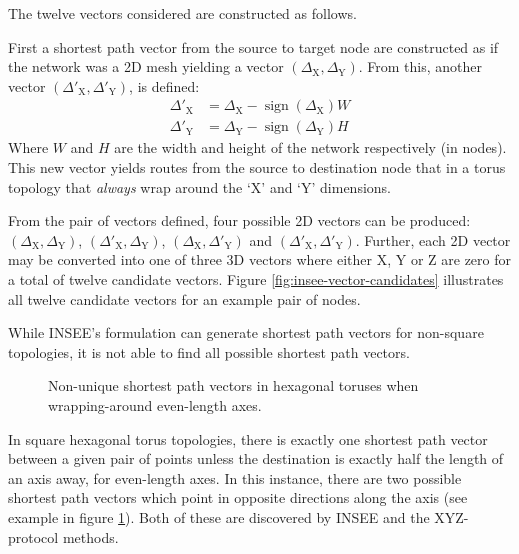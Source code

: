 			The twelve vectors considered are constructed as follows.
			
			First a shortest path vector from the source to target node are
			constructed as if the network was a 2D mesh yielding a vector
			$(\Delta_\textrm{X},\Delta_\textrm{Y})$. From this, another vector
			$(\Delta'_\textrm{X},\Delta'_\textrm{Y})$, is defined:
			\begin{align}
				\Delta'_\textrm{X} &= \Delta_\textrm{X} - \operatorname{sign}(\Delta_\textrm{X})W
				\\
				\Delta'_\textrm{Y} &= \Delta_\textrm{Y} - \operatorname{sign}(\Delta_\textrm{Y})H
			\end{align}
			Where $W$ and $H$ are the width and height of the network respectively
			(in nodes). This new vector yields routes from the source to destination
			node that in a torus topology that \emph{always} wrap around the `X' and
			`Y' dimensions.
			
			From the pair of vectors defined, four possible 2D vectors can be
			produced: $(\Delta_\textrm{X},\Delta_\textrm{Y})$,
			$(\Delta'_\textrm{X},\Delta_\textrm{Y})$,
			$(\Delta_\textrm{X},\Delta'_\textrm{Y})$ and
			$(\Delta'_\textrm{X},\Delta'_\textrm{Y})$. Further, each 2D vector may be
			converted into one of three 3D vectors where either X, Y or Z are zero
			for a total of twelve candidate vectors.  Figure
			\ref{fig:insee-vector-candidates} illustrates all twelve candidate
			vectors for an example pair of nodes.
			
			While INSEE's formulation can generate shortest path vectors for
			non-square topologies, it is not able to find all possible shortest
			path vectors.
			
			\begin{figure}
				\center
				
				\caption{Non-unique shortest path vectors in hexagonal toruses when
				wrapping-around even-length axes.}
				\label{fig:wrap-alternatives}
			\end{figure}
			
			In square hexagonal torus topologies, there is exactly one shortest path
			vector between a given pair of points unless the destination is exactly
			half the length of an axis away, for even-length axes. In this instance,
			there are two possible shortest path vectors which point in opposite
			directions along the axis (see example in figure
			\ref{fig:wrap-alternatives}). Both of these are discovered by INSEE and
			the XYZ-protocol methods.
			
